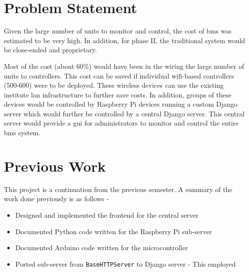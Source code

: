\documentclass[letterpaper,11pt]{report}
\begin{document}
\newpage
\chapter{Problem Statement}\label{chapter:problemstatement}
\onehalfspacing
Given the large number of units to monitor and control, the cost of \ac{bms} was estimated to be very high. In addition, for phase II, the traditional system would be close-ended and proprietary.
\par
Most of the cost (about 60\%) would have been in the wiring the large number of units to controllers. This cost can be saved if individual \ac{wifi}-based controllers (500-600) were to be deployed. These wireless devices can use the existing institute \ac{lan} infrastructure to further save costs. In addition, groups of these devices would be controlled by Raspberry Pi devices running a custom Django server which would further be controlled by a central Django server. This central server would provide a \ac{gui} for administrators to monitor and control the entire \ac{bms} system.

\newpage
\chapter{Previous Work}\label{chapter:previouswork}
\onehalfspacing
This project is a continuation from the previous semester. A summary of the work done previously is as follows -
\begin{itemize}
    \item Designed and implemented the frontend for the central server
    \item Documented Python code written for the Raspberry Pi sub-server
    \item Documented Arduino code written for the microcontroller
    \item Ported sub-server from \verb|BaseHTTPServer| to Django server - This employed
\end{itemize}

\newpage
\end{document}
